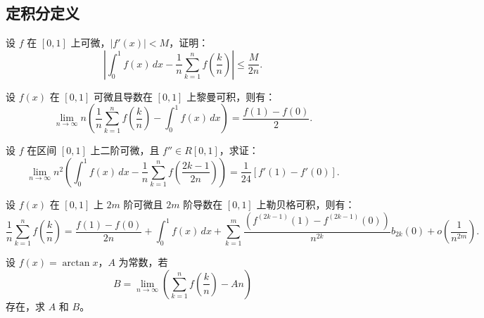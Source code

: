 \documentclass[lang=cn,10pt,thmcnt=section]{elegantbook}
\begin{document}
\subsection{定积分定义}
\begin{example}
	设 \( f \) 在 \([0,1]\) 上可微，\(\left|f'(x)\right| < M\)，证明：
\[
\left|\int_0^1 f(x) \, dx - \frac{1}{n} \sum_{k=1}^n f\left(\frac{k}{n}\right)\right| \leq \frac{M}{2n}.\]
\end{example}
\begin{example}
	设 \( f(x) \) 在 \([0,1]\) 可微且导数在 \([0,1]\) 上黎曼可积，则有：
\[
\lim_{n \to \infty} n \left( \frac{1}{n} \sum_{k=1}^n f\left(\frac{k}{n}\right) - \int_0^1 f(x) \, dx \right) = \frac{f(1) - f(0)}{2}.
\]
\end{example}
\begin{example}
	设 \( f \) 在区间 \([0,1]\) 上二阶可微，且 \( f'' \in R[0,1] \)，求证：
\[
\lim_{n \to \infty} n^2 \left( \int_0^1 f(x) \, dx - \frac{1}{n} \sum_{k=1}^n f\left(\frac{2k-1}{2n}\right) \right) = \frac{1}{24} [f'(1) - f'(0)].
\]
\end{example}
\begin{example}
	设 \( f(x) \) 在 \([0,1]\) 上 \(2m\) 阶可微且 \(2m\) 阶导数在 \([0,1]\) 上勒贝格可积，则有：
\[
\frac{1}{n} \sum_{k=1}^n f\left(\frac{k}{n}\right) = \frac{f(1) - f(0)}{2n} + \int_0^1 f(x) \, dx + \sum_{k=1}^m \frac{\left(f^{(2k-1)}(1) - f^{(2k-1)}(0)\right)}{n^{2k}} b_{2k}(0) + o\left(\frac{1}{n^{2m}}\right).
\]
\end{example}
\begin{example}
	设 \( f(x) = \arctan x \)，\( A \) 为常数，若
	\[
	B = \lim_{n \to \infty} \left( \sum_{k=1}^n f\left(\frac{k}{n}\right) - A n \right)
	\]
	存在，求 \( A \) 和 \( B \)。
\end{example}
\end{document}
